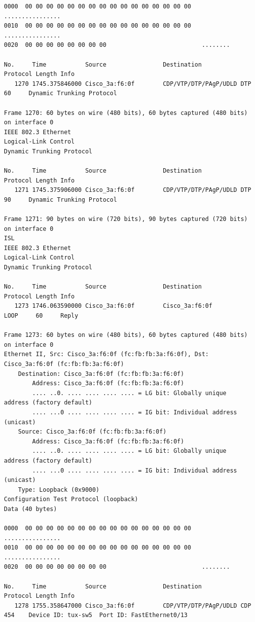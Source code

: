 \documentclass[a4paper,11pt]{article}
\begin{document}
\begin{lstlisting}
0000  00 00 00 00 00 00 00 00 00 00 00 00 00 00 00 00   ................
0010  00 00 00 00 00 00 00 00 00 00 00 00 00 00 00 00   ................
0020  00 00 00 00 00 00 00 00                           ........

No.     Time           Source                Destination           Protocol Length Info
   1270 1745.375846000 Cisco_3a:f6:0f        CDP/VTP/DTP/PAgP/UDLD DTP      60     Dynamic Trunking Protocol

Frame 1270: 60 bytes on wire (480 bits), 60 bytes captured (480 bits) on interface 0
IEEE 802.3 Ethernet 
Logical-Link Control
Dynamic Trunking Protocol

No.     Time           Source                Destination           Protocol Length Info
   1271 1745.375906000 Cisco_3a:f6:0f        CDP/VTP/DTP/PAgP/UDLD DTP      90     Dynamic Trunking Protocol

Frame 1271: 90 bytes on wire (720 bits), 90 bytes captured (720 bits) on interface 0
ISL
IEEE 802.3 Ethernet 
Logical-Link Control
Dynamic Trunking Protocol

No.     Time           Source                Destination           Protocol Length Info
   1273 1746.063590000 Cisco_3a:f6:0f        Cisco_3a:f6:0f        LOOP     60     Reply

Frame 1273: 60 bytes on wire (480 bits), 60 bytes captured (480 bits) on interface 0
Ethernet II, Src: Cisco_3a:f6:0f (fc:fb:fb:3a:f6:0f), Dst: Cisco_3a:f6:0f (fc:fb:fb:3a:f6:0f)
    Destination: Cisco_3a:f6:0f (fc:fb:fb:3a:f6:0f)
        Address: Cisco_3a:f6:0f (fc:fb:fb:3a:f6:0f)
        .... ..0. .... .... .... .... = LG bit: Globally unique address (factory default)
        .... ...0 .... .... .... .... = IG bit: Individual address (unicast)
    Source: Cisco_3a:f6:0f (fc:fb:fb:3a:f6:0f)
        Address: Cisco_3a:f6:0f (fc:fb:fb:3a:f6:0f)
        .... ..0. .... .... .... .... = LG bit: Globally unique address (factory default)
        .... ...0 .... .... .... .... = IG bit: Individual address (unicast)
    Type: Loopback (0x9000)
Configuration Test Protocol (loopback)
Data (40 bytes)

0000  00 00 00 00 00 00 00 00 00 00 00 00 00 00 00 00   ................
0010  00 00 00 00 00 00 00 00 00 00 00 00 00 00 00 00   ................
0020  00 00 00 00 00 00 00 00                           ........

No.     Time           Source                Destination           Protocol Length Info
   1278 1755.358647000 Cisco_3a:f6:0f        CDP/VTP/DTP/PAgP/UDLD CDP      454    Device ID: tux-sw5  Port ID: FastEthernet0/13  


\end{lstlisting}
\end{document}
